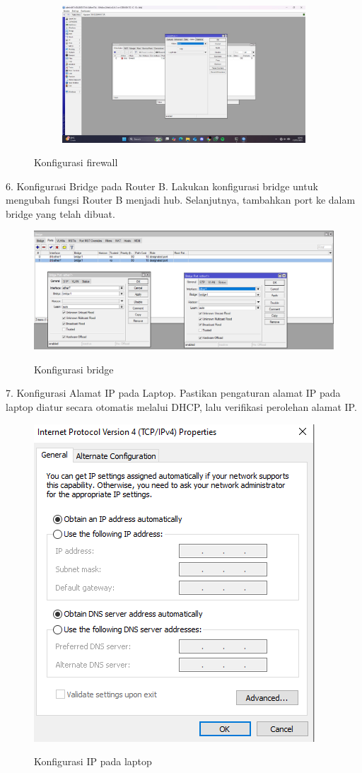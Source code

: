\begin{figure}[H]
\begin{subfigure}[b]{0.3\linewidth}
    \end{subfigure}
    \hspace{1cm}
    \begin{subfigure}[b]{0.3\linewidth}
      \centering
      \includegraphics[width=\linewidth]{image/clnt7.jpg}
    \end{subfigure}
    \caption{Konfigurasi firewall}
\end{figure}
6. Konfigurasi Bridge pada Router B. Lakukan konfigurasi bridge untuk mengubah fungsi Router B menjadi hub. Selanjutnya, tambahkan port ke dalam bridge yang telah dibuat.
\begin{figure}[H]
    \centering
    \includegraphics[width=0.65\linewidth]{image/bdg2.png}
    \label{fig:inirujukan}
    \caption{Konfigurasi bridge}
\end{figure}
7. Konfigurasi Alamat IP pada Laptop. Pastikan pengaturan alamat IP pada laptop diatur secara otomatis melalui DHCP, lalu verifikasi perolehan alamat IP.
\begin{figure}[H]
    \centering
    \includegraphics[width=0.65\linewidth]{image/bdg3.png}
    \label{fig:inirujukan}
    \caption{Konfigurasi IP pada laptop}
\end{figure}
